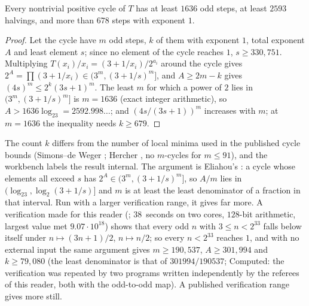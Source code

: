 \begin{theorem}\label{thm:678}
Every nontrivial positive cycle of $T$ has at least $1636$ odd steps, at least $2593$ halvings, and more than $678$ steps with exponent $1$.
\end{theorem}
\begin{proof}
Let the cycle have $m$ odd steps, $k$ of them with exponent $1$, total exponent $A$ and least element $s$; since no element of the cycle reaches $1$, $s\ge330{,}751$. Multiplying $T(x_i)/x_i=(3+1/x_i)/2^{a_i}$ around the cycle gives $2^A=\prod(3+1/x_i)\in(3^m,(3+1/s)^m]$, and $A\ge2m-k$ gives $(4s)^m\le2^k(3s+1)^m$. The least $m$ for which a power of $2$ lies in $(3^m,(3+1/s)^m]$ is $m=1636$ (exact integer arithmetic), so $A>1636\log_23=2592.998\ldots$; and $(4s/(3s+1))^m$ increases with $m$; at $m=1636$ the inequality needs $k\ge679$.
\end{proof}
The count $k$ differs from the number of local minima used in the published cycle bounds (Simons--de Weger \cite{SimonsdeWeger}; Hercher \cite{Hercher}, no $m$-cycles for $m\le91$), and the workbench labels the result internal. The argument is Eliahou's \cite{Eliahou}: a cycle whose elements all exceed $s$ has $2^A\in(3^m,(3+1/s)^m]$, so $A/m$ lies in $(\log_23,\log_2(3+1/s)]$ and $m$ is at least the least denominator of a fraction in that interval. Run with a larger verification range, it gives far more. A verification made for this reader (; 38~seconds on two cores, $128$-bit arithmetic, largest value met $9.07\cdot10^{18}$) shows that every odd $n$ with $3\le n<2^{33}$ falls below itself under $n\mapsto(3n+1)/2$, $n\mapsto n/2$; so every $n<2^{33}$ reaches $1$, and with no external input the same argument gives $m\ge190{,}537$, $A\ge301{,}994$ and $k\ge79{,}080$ (the least denominator is that of $301994/190537$; \textsf{Computed}: the verification was repeated by two programs written independently by the referees of this reader, both with the odd-to-odd map). A published verification range gives more still.

